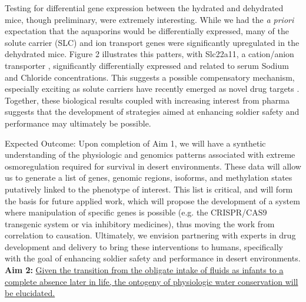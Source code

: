 \documentclass[12pt]{article}
\begin{document}
Testing for differential gene expression between the hydrated and dehydrated mice, though preliminary, were extremely interesting. While we had the \textit{a priori} expectation that the aquaporins would be differentially expressed, many of the solute carrier (SLC) and ion transport genes were significantly upregulated in the dehydrated mice. Figure 2 illustrates this patters, with Slc22a11, a cation/anion transporter \citep{Koepsell:2004kg}, significantly differentially expressed and related to serum Sodium and Chloride concentrations. This suggests a possible compensatory mechanism, especially exciting as solute carriers have recently emerged as novel drug targets \citep{RaskAndersen:2013cu}. Together, these biological results coupled with increasing interest from pharma suggests that the development of strategies aimed at enhancing soldier safety and performance may ultimately be possible.  


Expected Outcome: Upon completion of Aim 1, we will have a synthetic understanding of the physiologic and genomics patterns associated with extreme osmoregulation required for survival in desert environments. These data will allow us to generate a list of genes, genomic regions, isoforms, and methylation states putatively linked to the phenotype of interest. This list is critical, and will form the basis for future applied work, which will propose the development of a system where manipulation of specific genes is possible (e.g. the CRISPR/CAS9 transgenic system or via inhibitory medicines), thus moving the work from correlation to causation. Ultimately, we envision partnering with experts in drug development and delivery to bring these interventions to humans, specifically with the goal of enhancing soldier safety and performance in desert environments. \\

\noindent \textbf{Aim 2:} \ul{Given the transition from the obligate intake of fluids as infants to a complete absence later in life, the ontogeny of physiologic water conservation will be elucidated.} \\
\end{document}
